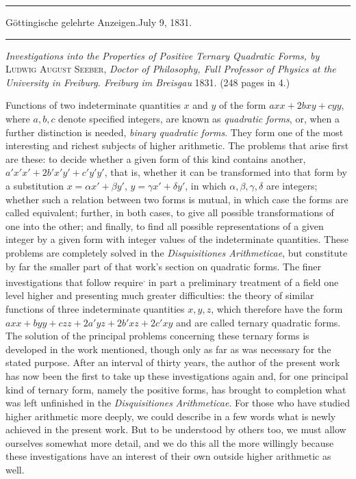 \begin{center}
\rule{.86\linewidth}{.3pt}\par
Göttingische gelehrte Anzeigen.\quad July 9, 1831.\par
\rule{.86\linewidth}{.3pt}
\end{center}
\emph{Investigations into the Properties of Positive Ternary Quadratic Forms, by} \textsc{Ludwig August Seeber}, \emph{Doctor of Philosophy, Full Professor of Physics at the University in Freiburg. Freiburg im Breisgau} 1831. (248 pages in 4.)

Functions of two indeterminate quantities $x$ and $y$ of the form $axx+2bxy+cyy$, where $a,b,c$ denote specified integers, are known as \emph{quadratic forms}, or, when a further distinction is needed, \emph{binary quadratic forms}. They form one of the most interesting and richest subjects of higher arithmetic. The problems that arise first are these: to decide whether a given form of this kind contains another, $a'x'x'+2b'x'y'+c'y'y'$, that is, whether it can be transformed into that form by a substitution $x=\alpha x'+\beta y'$, $y=\gamma x'+\delta y'$, in which $\alpha,\beta,\gamma,\delta$ are integers; whether such a relation between two forms is mutual, in which case the forms are called equivalent; further, in both cases, to give all possible transformations of one into the other; and finally, to find all possible representations of a given integer by a given form with integer values of the indeterminate quantities. These problems are completely solved in the \emph{Disquisitiones Arithmeticae}, but constitute by far the smaller part of that work's section on quadratic forms. The finer investigations that follow require\textsuperscript{.} in part a preliminary treatment of a field one level higher and presenting much greater difficulties: the theory of similar functions of three indeterminate quantities $x,y,z$, which therefore have the form $axx+byy+czz+2a'yz+2b'xz+2c'xy$ and are called ternary quadratic forms. The solution of the principal problems concerning these ternary forms is developed in the work mentioned, though only as far as was necessary for the stated purpose. After an interval of thirty years, the author of the present work has now been the first to take up these investigations again and, for one principal kind of ternary form, namely the positive forms, has brought to completion what was left unfinished in the \emph{Disquisitiones }
\emph{Arithmeticae}. For those who have studied higher arithmetic more deeply, we could describe in a few words what is newly achieved in the present work. But to be understood by others too, we must allow ourselves somewhat more detail, and we do this all the more willingly because these investigations have an interest of their own outside higher arithmetic as well.

